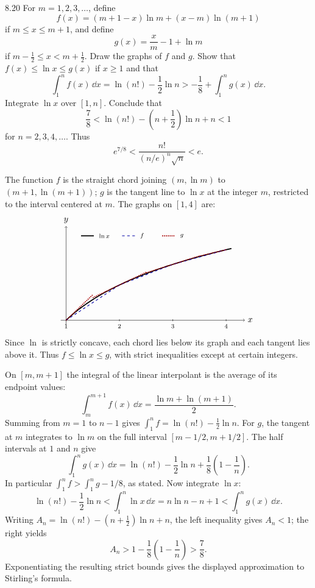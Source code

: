 \documentclass[11pt, oneside]{article}
\begin{document}
\begin{exercise}{8.20}
For $m=1, 2, 3, \ldots$, define
\[
 f(x)=(m+1-x)\ln m+(x-m)\ln(m+1)
\]
if $m\le x\le m+1$, and define
\[
 g(x)=\frac xm-1+\ln m
\]
if $m-\frac12\le x<m+\frac12$. Draw the graphs of $f$ and $g$. Show that $f(x)\le\ln x\le g(x)$ if $x\ge1$ and that
\[
 \int_1^nf(x)\,\dd x=\ln(n!)-\frac12\ln n> -\frac18+\int_1^ng(x)\,\dd x.
\]
Integrate $\ln x$ over $[1, n]$. Conclude that
\[
 \frac78<\ln(n!)-\left(n+\frac12\right)\ln n+n<1
\]
for $n=2, 3, 4, \ldots$.  Thus
\[
 e^{7/8}<\frac{n!}{(n/e)^n\sqrt n}<e.
\]
\end{exercise}
\begin{solution}
The function $f$ is the straight chord joining $(m, \ln m)$ to $(m+1, \ln(m+1))$; $g$ is the tangent line to $\ln x$ at the integer $m$, restricted to the interval centered at $m$. The graphs on $[1, 4]$ are:
\[
\begin{tikzpicture}[x=2.2cm, y=2.1cm, baseline=(current bounding box.center)]
 \draw[->] (0.9, 0) -- (4.35, 0) node[right] {$x$};
 \draw[->] (1, -0.08) -- (1, 1.85) node[above] {$y$};
 \foreach \m in {1, 2, 3, 4} {\draw (\m, 0.02)--(\m, -0.02) node[below] {\scriptsize $\m$};}
 \draw[very thick] plot[domain=1:4.1, samples=120] (\x, {ln(\x)});
 \draw[blue!65!black, thick, dashed] (1, 0)--(2, {ln(2)})--(3, {ln(3)})--(4, {ln(4)});
 \draw[red!65!black, densely dotted, very thick] (1, 0)--(1.5, 0.5);
 \draw[red!65!black, densely dotted, very thick] (1.5, {1.5/2-1+ln(2)})--(2.5, {2.5/2-1+ln(2)});
 \draw[red!65!black, densely dotted, very thick] (2.5, {2.5/3-1+ln(3)})--(3.5, {3.5/3-1+ln(3)});
 \draw[red!65!black, densely dotted, very thick] (3.5, {3.5/4-1+ln(4)})--(4, {ln(4)});
 \draw[very thick] (1.28, 1.66)--(1.52, 1.66);
 \node[anchor=west] at (1.56, 1.66) {\scriptsize $\ln x$};
 \draw[blue!65!black, thick, dashed] (2.05, 1.66)--(2.29, 1.66);
 \node[anchor=west] at (2.33, 1.66) {\scriptsize $f$};
 \draw[red!65!black, densely dotted, very thick] (2.8, 1.66)--(3.04, 1.66);
 \node[anchor=west] at (3.08, 1.66) {\scriptsize $g$};
\end{tikzpicture}
\]
Since $\ln$ is strictly concave, each chord lies below its graph and each tangent lies above it. Thus $f\le\ln x\le g$, with strict inequalities except at certain integers.

On $[m, m+1]$ the integral of the linear interpolant is the average of its endpoint values:
\[
 \int_m^{m+1}f(x)\,\dd x=\frac{\ln m+\ln(m+1)}2.
\]
Summing from $m=1$ to $n-1$ gives $\int_1^nf=\ln(n!)-\frac12\ln n$. For $g$, the tangent at $m$ integrates to $\ln m$ on the full interval $[m-1/2, m+1/2]$. The half intervals at $1$ and $n$ give
\[
 \int_1^ng(x)\,\dd x=\ln(n!)-\frac12\ln n+\frac18\left(1-\frac1n\right).
\]
In particular $\int_1^nf>\int_1^ng-1/8$, as stated. Now integrate $\ln x$:
\[
 \ln(n!)-\frac12\ln n
 <\int_1^n\ln x\,\dd x=n\ln n-n+1
 <\int_1^ng(x)\,\dd x.
\]
Writing $A_n=\ln(n!)-(n+\tfrac12)\ln n+n$, the left inequality gives $A_n<1$; the right yields
\[
 A_n>1-\frac18\left(1-\frac1n\right)>\frac78.
\]
Exponentiating the resulting strict bounds gives the displayed approximation to Stirling's formula.
\end{solution}
\end{document}
